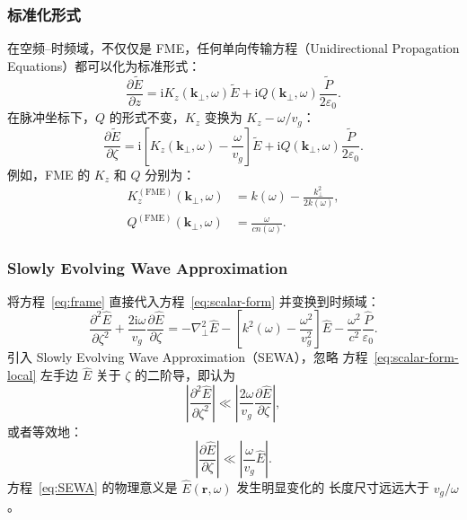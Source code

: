 \documentclass[a4paper,12pt]{ctexart}
\numberwithin{equation}{section}
\newcommand{\vect}[1]{\bm{#1}}
\begin{document}
\subsubsection{标准化形式}
在空频--时频域，不仅仅是 FME，任何单向传输方程（Unidirectional Propagation
Equations）都可以化为标准形式：
\begin{equation}
  \frac{\partial\tilde{E}}{\partial z}
  =\mathrm{i}K_z(\vect{k}_\perp,\omega)\tilde{E}
  +\mathrm{i}Q(\vect{k}_\perp,\omega)\frac{\tilde{P}}{2\varepsilon_0}.
  \label{eq:canonical}
\end{equation}
在脉冲坐标下，$Q$ 的形式不变，$K_z$ 变换为 $K_z-\omega/v_g$：
\begin{equation}
  \frac{\partial\tilde{E}}{\partial\zeta}
  =\mathrm{i}\left[K_z(\vect{k}_\perp,\omega)-\frac{\omega}{v_g}\right]\tilde{E}
  +\mathrm{i}Q(\vect{k}_\perp,\omega)\frac{\tilde{P}}{2\varepsilon_0}.
  \label{eq:canonical-local}
\end{equation}
例如，FME 的 $K_z$ 和 $Q$ 分别为：
\begin{equation}
  \begin{aligned}
    K_z^{(\mathrm{FME})}(\vect{k}_\perp,\omega)
     & =k(\omega)-\frac{k_\perp^2}{2k(\omega)}, \\
    Q^{(\mathrm{FME})}(\vect{k}_\perp,\omega)
     & =\frac{\omega}{cn(\omega)}.
  \end{aligned}
\end{equation}

\subsubsection{Slowly Evolving Wave Approximation}
将方程~\eqref{eq:frame} 直接代入方程~\eqref{eq:scalar-form} 并变换到时频域：
\begin{equation}
  \frac{\partial^2\hat{E}}{\partial\zeta^2}
  +\frac{2\mathrm{i}\omega}{v_g}\frac{\partial\hat{E}}{\partial\zeta}
  =-\nabla_\perp^2\hat{E}
  -\left[k^2(\omega)-\frac{\omega^2}{v_g^2}\right]\hat{E}
  -\frac{\omega^2}{c^2}\frac{\hat{P}}{\varepsilon_0}.
  \label{eq:scalar-form-local}
\end{equation}
引入 Slowly Evolving Wave Approximation（SEWA），忽略
方程~\eqref{eq:scalar-form-local} 左手边 $\hat{E}$ 关于 $\zeta$ 的二阶导，即认为
\begin{equation}
  \left|\frac{\partial^2\hat{E}}{\partial\zeta^2}\right|
  \ll\left|\frac{2\omega}{v_g}\frac{\partial\hat{E}}{\partial\zeta}\right|,
\end{equation}
或者等效地：
\begin{equation}
  \left|\frac{\partial\hat{E}}{\partial\zeta}\right|
  \ll\left|\frac{\omega}{v_g}\hat{E}\right|.
  \label{eq:SEWA}
\end{equation}
方程~\eqref{eq:SEWA} 的物理意义是 $\hat{E}(\vect{r},\omega)$ 发生明显变化的
长度尺寸远远大于 $v_g/\omega$。
\end{document}
